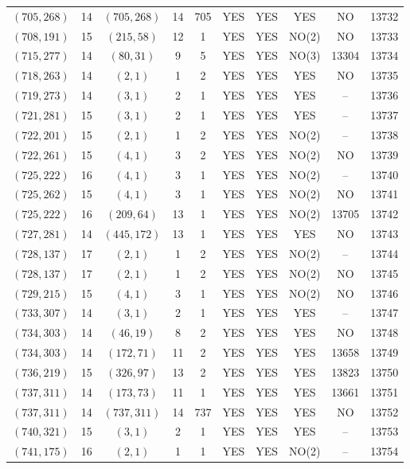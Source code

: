 \begin{longtable}{|c|c|c|c|c|c|c|c|c|c|}
$(705, 268)$ & 14 & $(705, 268)$ & 14 & 705 & YES & YES & YES & NO & 13732\\
$(708, 191)$ & 15 & $(215, 58)$ & 12 & 1 & YES & YES & NO(2) & NO & 13733\\
$(715, 277)$ & 14 & $(80, 31)$ & 9 & 5 & YES & YES & NO(3) & 13304 & 13734\\
$(718, 263)$ & 14 & $(2, 1)$ & 1 & 2 & YES & YES & YES & NO & 13735\\
$(719, 273)$ & 14 & $(3, 1)$ & 2 & 1 & YES & YES & YES & -- & 13736\\
$(721, 281)$ & 15 & $(3, 1)$ & 2 & 1 & YES & YES & YES & -- & 13737\\
$(722, 201)$ & 15 & $(2, 1)$ & 1 & 2 & YES & YES & NO(2) & -- & 13738\\
$(722, 261)$ & 15 & $(4, 1)$ & 3 & 2 & YES & YES & NO(2) & NO & 13739\\
$(725, 222)$ & 16 & $(4, 1)$ & 3 & 1 & YES & YES & NO(2) & -- & 13740\\
$(725, 262)$ & 15 & $(4, 1)$ & 3 & 1 & YES & YES & NO(2) & NO & 13741\\
$(725, 222)$ & 16 & $(209, 64)$ & 13 & 1 & YES & YES & NO(2) & 13705 & 13742\\
$(727, 281)$ & 14 & $(445, 172)$ & 13 & 1 & YES & YES & YES & NO & 13743\\
$(728, 137)$ & 17 & $(2, 1)$ & 1 & 2 & YES & YES & NO(2) & -- & 13744\\
$(728, 137)$ & 17 & $(2, 1)$ & 1 & 2 & YES & YES & NO(2) & NO & 13745\\
$(729, 215)$ & 15 & $(4, 1)$ & 3 & 1 & YES & YES & NO(2) & NO & 13746\\
$(733, 307)$ & 14 & $(3, 1)$ & 2 & 1 & YES & YES & YES & -- & 13747\\
$(734, 303)$ & 14 & $(46, 19)$ & 8 & 2 & YES & YES & YES & NO & 13748\\
$(734, 303)$ & 14 & $(172, 71)$ & 11 & 2 & YES & YES & YES & 13658 & 13749\\
$(736, 219)$ & 15 & $(326, 97)$ & 13 & 2 & YES & YES & YES & 13823 & 13750\\
$(737, 311)$ & 14 & $(173, 73)$ & 11 & 1 & YES & YES & YES & 13661 & 13751\\
$(737, 311)$ & 14 & $(737, 311)$ & 14 & 737 & YES & YES & YES & NO & 13752\\
$(740, 321)$ & 15 & $(3, 1)$ & 2 & 1 & YES & YES & YES & -- & 13753\\
$(741, 175)$ & 16 & $(2, 1)$ & 1 & 1 & YES & YES & NO(2) & -- & 13754\\

\end{longtable}
